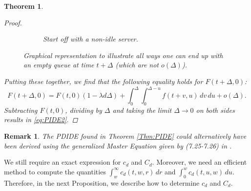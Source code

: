 \documentclass[12pt]{report}
\newtheorem{theorem}{Theorem}
\newtheorem{remark}{Remark}
\begin{document}
\begin{theorem}
\begin{proof}
\begin{figure}
\begin{subfigure}{.35\textwidth}
\caption{Start off with a non-idle server.}
\end{subfigure}
\centering
\caption{Graphical representation to illustrate all ways one can end up with an empty queue at time $t+\Delta$ (which are not $o(\Delta)$).} \label{fig:Q1Q2Q3}
\end{figure}
Putting these together, we find that the following equality holds for $F(t+\Delta, 0)$:
$$F(t+\Delta, 0) = F(t,0)(1 - \lambda d \Delta) + \int_0^\Delta 
\int_0^{\Delta-u} f(t+v, u)\, dv\, du + o(\Delta).$$
Subtracting $F(t,0)$, dividing by $\Delta$ and taking the limit $\Delta \rightarrow 0$ on both sides results in \eqref{eq:PIDE2}.
\end{proof}
\end{theorem}
\begin{remark}
The PDIDE found in Theorem \ref{Thm:PIDE} could alternatively have been derived using the generalized Master Equation given by (7.25-7.26) in \cite{schuss2009theory}.
\end{remark}
We still require an exact expression for $c_d$ and $C_d$. Moreover, we need an efficient method to compute the quantities $\int_w^\infty c_d(t,w,r)\, dr$ and $\int_0^w c_d(t,u,w)\, du$. Therefore, in the next Proposition, we describe how to determine $c_d$ and $C_d$.
\end{document}
